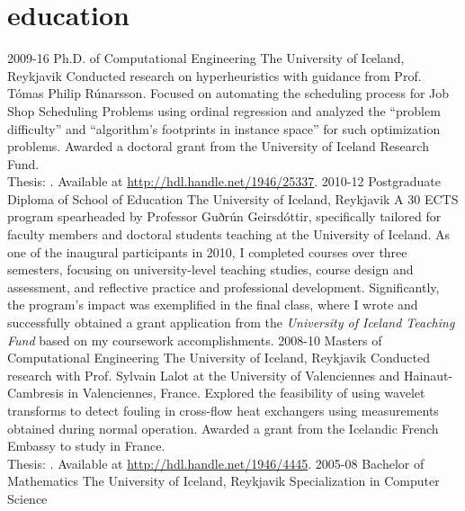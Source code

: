 \section{education}
\begin{entrylist}
\entry
{2009-16}
{Ph.D. {\normalfont of Computational Engineering}}
{The University of Iceland, Reykjavik}
{Conducted research on hyperheuristics with guidance from Prof. Tómas Philip Rúnarsson. Focused on automating the scheduling process for Job Shop Scheduling Problems using ordinal regression and analyzed the ``problem difficulty'' and ``algorithm's footprints in instance space'' for such optimization problems. Awarded a doctoral grant from the University of Iceland Research Fund. \\
{\boldfont Thesis:} . 
Available at \url{http://hdl.handle.net/1946/25337}.}
\entry
{2010-12}
{Postgraduate Diploma {\normalfont of School of Education}}
{The University of Iceland, Reykjavik}
{A 30 ECTS program spearheaded by Professor Guðrún Geirsdóttir, specifically tailored for faculty members and doctoral students teaching at the University of Iceland. As one of the inaugural participants in 2010, I completed courses over three semesters, focusing on university-level teaching studies, course design and assessment, and reflective practice and professional development. Significantly, the program's impact was exemplified in the final class, where I wrote and successfully obtained a grant application from the \textit{University of Iceland Teaching Fund} based on my coursework accomplishments.}
\entry
{2008-10}
{Masters {\normalfont of Computational Engineering}}
{The University of Iceland, Reykjavik}
{Conducted research with Prof. Sylvain Lalot at the University of Valenciennes and Hainaut-Cambresis in Valenciennes, France. Explored the feasibility of using wavelet transforms to detect fouling in cross-flow heat exchangers using measurements obtained during normal operation.
Awarded a grant from the Icelandic French Embassy to study in France. \\	
{\boldfont Thesis:} . 
Available at \url{http://hdl.handle.net/1946/4445}.}
\entry
{2005-08}
{Bachelor {\normalfont of Mathematics}}
{The University of Iceland, Reykjavik}
{Specialization in Computer Science}
\end{entrylist}
